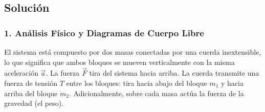 \documentclass[12pt, a4paper]{article}
\begin{document}
\begin{center}
\end{center}

\subsection*{Solución}

\subsubsection*{1. Análisis Físico y Diagramas de Cuerpo Libre}
El sistema está compuesto por dos masas conectadas por una cuerda inextensible, lo que significa que ambos bloques se mueven verticalmente con la misma aceleración $\vec{a}$. 
La fuerza $\vec{F}$ tira del sistema hacia arriba. La cuerda transmite una fuerza de tensión $T$ entre los bloques: tira hacia abajo del bloque $m_1$ y hacia arriba del bloque $m_2$. Adicionalmente, sobre cada masa actúa la fuerza de la gravedad (el peso).
\end{document}
